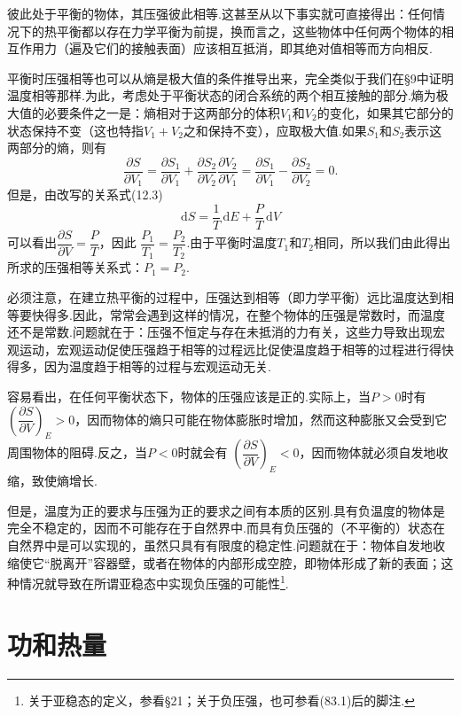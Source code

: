 彼此处于平衡的物体，其压强彼此相等.这甚至从以下事实就可直接得出：任何情况下的热平衡都以存在力学平衡为前提，换而言之，这些物体中任何两个物体的相互作用力（遍及它们的接触表面）应该相互抵消，即其绝对值相等而方向相反.

平衡时压强相等也可以从熵是极大值的条件推导出来，完全类似于我们在§9中证明温度相等那样.为此，考虑处于平衡状态的闭合系统的两个相互接触的部分.熵为极大值的必要条件之一是：熵相对于这两部分的体积$V_1$和$V_2$的变化，如果其它部分的状态保持不变（这也特指$V_1+V_2$之和保持不变），应取极大值.如果$S_1$和$S_2$表示这两部分的熵，则有
\begin{equation*}
  \frac{\partial S}{\partial V_1}
  =\frac{\partial S_1}{\partial V_1}
  +\frac{\partial S_2}{\partial V_2}\frac{\partial V_2}{\partial V_1}
  =\frac{\partial S_1}{\partial V_1}
  -\frac{\partial S_2}{\partial V_2}=0.
\end{equation*}
但是，由改写的关系式(12.3)
\begin{equation*}
  \mathrm{d}S=\frac{1}{T}\,\mathrm{d}E+\frac{P}{T}\,\mathrm{d}V
\end{equation*}
可以看出$\dfrac{\partial S}{\partial V}=\dfrac{P}{T}$，因此
$\dfrac{P_1}{T_1}=\dfrac{P_2}{T_2}$.由于平衡时温度$T_1$和$T_2$相同，所以我们由此得出所求的压强相等关系式：$P_1=P_2$.

必须注意，在建立热平衡的过程中，压强达到相等（即力学平衡）远比温度达到相等要快得多.因此，常常会遇到这样的情况，在整个物体的压强是常数时，而温度还不是常数.问题就在于：压强不恒定与存在未抵消的力有关，这些力导致出现宏观运动，宏观运动促使压强趋于相等的过程远比促使温度趋于相等的过程进行得快得多，因为温度趋于相等的过程与宏观运动无关.

容易看出，在任何平衡状态下，物体的压强应该是正的.实际上，当$P>0$时有
$\left(\dfrac{\partial S}{\partial V}\right)_E>0$，因而物体的熵只可能在物体膨胀时增加，然而这种膨胀又会受到它周围物体的阻碍.反之，当$P<0$时就会有
$\left(\dfrac{\partial S}{\partial V}\right)_E<0$，因而物体就必须自发地收缩，致使熵增长.

但是，温度为正的要求与压强为正的要求之间有本质的区别.具有负温度的物体是完全不稳定的，因而不可能存在于自然界中.而具有负压强的（不平衡的）状态在自然界中是可以实现的，虽然只具有有限度的稳定性.问题就在于：物体自发地收缩使它“脱离开”容器壁，或者在物体的内部形成空腔，即物体形成了新的表面；这种情况就导致在所谓亚稳态中实现负压强的可能性\footnote{关于亚稳态的定义，参看§21；关于负压强，也可参看(83.1)后的脚注.}.

\section{功和热量}

